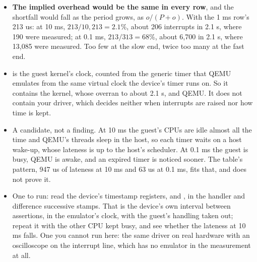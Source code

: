 \begin{itemize}
  \item \textbf{The implied overhead would be the same in every row}, and the shortfall would fall
    as the period grows, as $o/(P+o)$. With the 1 ms row's 213 us: at 10 ms, $213/10{,}213 = 2.1\%$,
    about 206 interrupts in 2.1 s, where 190 were measured; at 0.1 ms, $213/313 = 68\%$, about 6,700
    in 2.1 s, where 13,085 were measured. Too few at the slow end, twice too many at the fast end.
  \item {} is the guest kernel's clock, counted from the generic timer that QEMU
    emulates from the same virtual clock the device's timer runs on. So it contains the kernel,
    whose  overran to about 2.1 s, and QEMU. It does not contain your driver, which
    decides neither when interrupts are raised nor how time is kept.
  \item A candidate, not a finding. At 10 ms the guest's CPUs are idle almost all the time and
    QEMU's threads sleep in the host, so each timer waits on a host wake-up, whose lateness is up to
    the host's scheduler. At 0.1 ms the guest is busy, QEMU is awake, and an expired timer is
    noticed sooner. The table's pattern, 947 us of lateness at 10 ms and 63 us at 0.1 ms, fits
    that, and does not prove it.
  \item One to run: read the device's timestamp registers,  and , in
    the handler and difference successive stamps. That is the device's own interval between
    assertions, in the emulator's clock, with the guest's handling taken out; repeat it with the
    other CPU kept busy, and see whether the lateness at 10 ms falls. One you cannot run here: the
    same driver on real hardware with an oscilloscope on the interrupt line, which has no emulator
    in the measurement at all.
\end{itemize}

